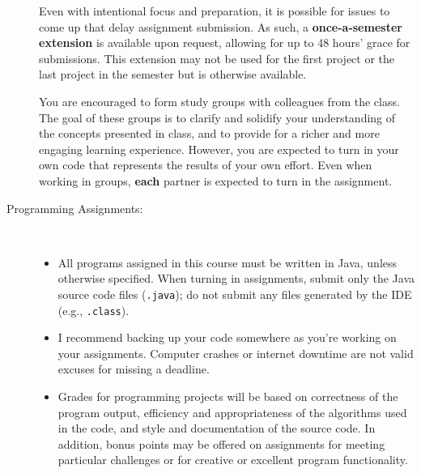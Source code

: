\documentclass [letterpaper,11pt]{article}
\begin{document}
\begin{description}
Even with intentional focus and preparation, it is possible for issues to come up that delay assignment submission.  As such, a \textbf{once-a-semester extension} is available upon request, allowing for up to 48 hours' grace for submissions. This extension may not be used for the first project or the last project in the semester but is otherwise available.

You are encouraged to form study groups with colleagues from the class. The goal of these groups is to clarify and solidify your understanding of the concepts presented in class, and to provide for a richer and more engaging learning experience. However, you are expected to turn in your own code that represents the results of your own effort. Even when working in groups, \textbf{each} partner is expected to turn in the assignment.

\item[Programming Assignments:]\

\begin{itemize}\setlength{\itemsep}{0em}\setlength{\parskip}{0pt}
	\item All programs assigned in this course must be written in Java, unless otherwise specified.  When turning in assignments,
	submit only the Java source code files (\texttt{.java}); do not submit any files generated by the IDE (e.g., \texttt{.class}).	
			\item I recommend backing up your code somewhere as you're working on your assignments.  Computer
		crashes or internet downtime are not valid excuses for missing a deadline.
				

\item Grades for programming projects will be based on correctness of the program output, efficiency and appropriateness of the algorithms used in the code, and style and documentation of the source code.  In addition, bonus points may be offered on assignments for meeting particular challenges or for creative or excellent program functionality.


\end{itemize}
\end{description}
\end{document}

